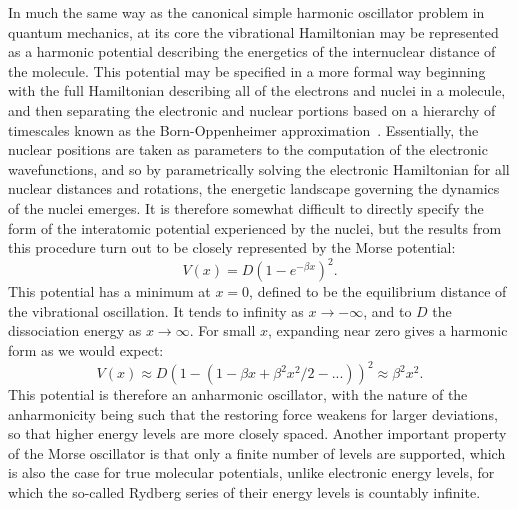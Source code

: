 In much the same way as the canonical simple harmonic oscillator problem in quantum mechanics, at its core the vibrational Hamiltonian may be represented as a harmonic potential describing the energetics of the internuclear distance of the molecule.
This potential may be specified in a more formal way beginning with the full Hamiltonian describing all of the electrons and nuclei in a molecule, and then separating the electronic and nuclear portions based on a hierarchy of timescales known as the Born-Oppenheimer approximation~\citep[Sec.~8.1]{Atkins2005}.
Essentially, the nuclear positions are taken as parameters to the computation of the electronic wavefunctions, and so by parametrically solving the electronic Hamiltonian for all nuclear distances and rotations, the energetic landscape governing the dynamics of the nuclei emerges.
It is therefore somewhat difficult to directly specify the form of the interatomic potential experienced by the nuclei, but the results from this procedure turn out to be closely represented by the Morse potential:
\begin{equation}
V(x) = D\left(1-e^{-\beta x}\right)^2.\label{eqmorse}
\end{equation}
This potential has a minimum at $x=0$, defined to be the equilibrium distance of the vibrational oscillation. It tends to infinity as $x\rightarrow-\infty$, and to $D$ the dissociation energy as $x\rightarrow\infty$. For small $x$, expanding near zero gives a harmonic form as we would expect:
\begin{equation}
V(x) \approx D\left(1-(1-\beta x + \beta^2 x^2 / 2 - ...)\right)^2 \approx \beta^2 x^2.
\end{equation}
This potential is therefore an anharmonic oscillator, with the nature of the anharmonicity being such that the restoring force weakens for larger deviations, so that higher energy levels are more closely spaced.
Another important property of the Morse oscillator is that only a finite number of levels are supported, which is also the case for true molecular potentials, unlike electronic energy levels, for which the so-called Rydberg series of their energy levels is countably infinite.

